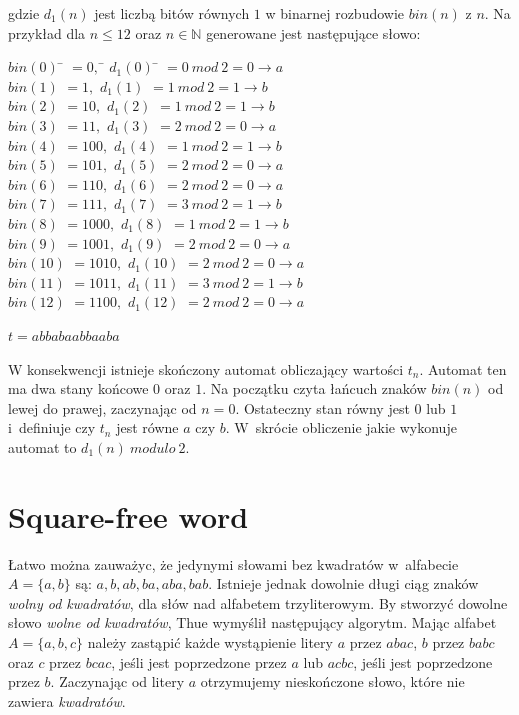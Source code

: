 \documentclass[document]{xmgr}
\begin{document}
\noindent gdzie $d_1(n)$ jest liczbą bitów równych $1$ w binarnej rozbudowie $bin(n)$ z $n$. Na przykład dla $n \leq 12$ oraz $n \in \mathbb{N}$ generowane jest następujące słowo:

\begin{tabbing}
\centering
$bin(0)$\hspace{1em} \= $= 0,$\hspace{7em} \= $d_1 (0)$\hspace{1em} \= $= 0\ mod\ 2 = 0 \to a$ \\
$bin(1)$ \> $= 1,$ \> $d_1 (1)$ \> $= 1\ mod\ 2 = 1 \to b$\\
$bin(2)$ \> $= 10,$ \> $d_1 (2)$ \> $= 1\ mod\ 2 = 1 \to b$\\
$bin(3)$ \> $= 11,$ \> $d_1 (3)$ \> $= 2\ mod\ 2 = 0 \to a$\\
$bin(4)$ \> $= 100,$ \> $d_1 (4)$ \> $= 1\ mod\ 2 = 1 \to b$\\
$bin(5)$ \> $= 101,$ \> $d_1 (5)$ \> $= 2\ mod\ 2 = 0 \to a$\\
$bin(6)$ \> $= 110,$ \> $d_1 (6)$ \> $= 2\ mod\ 2 = 0 \to a$\\
$bin(7)$ \> $= 111,$ \> $d_1 (7)$ \> $= 3\ mod\ 2 = 1 \to b$\\
$bin(8)$ \> $= 1000,$ \> $d_1 (8)$ \> $= 1\ mod\ 2 = 1 \to b$\\
$bin(9)$ \> $= 1001,$ \> $d_1 (9)$ \> $= 2\ mod\ 2 = 0 \to a$\\
$bin(10)$ \> $= 1010,$	\> $d_1 (10)$ \> $= 2\ mod\ 2 = 0 \to a$\\
$bin(11)$ \> $= 1011,$ 	\> $d_1 (11)$ \> $= 3\ mod\ 2 = 1 \to b$\\
$bin(12)$ \> $= 1100,$ 	\> $d_1 (12)$ \> $= 2\ mod\ 2 = 0 \to a$
\end{tabbing}

{\centering $t = abbabaabbaaba$ \par}

W konsekwencji istnieje skończony automat obliczający wartości $t_n$. Automat ten ma dwa stany końcowe $0$ oraz $1$. Na początku czyta łańcuch znaków $bin(n)$ od lewej do prawej, zaczynając od $n=0$. Ostateczny stan równy jest $0$ lub $1$ i~definiuje czy $t_n$ jest równe $a$ czy $b$. W~skrócie obliczenie jakie wykonuje automat to $d_1(n)\ modulo\ 2$.


\section{Square-free word}
Łatwo można zauważyc, że jedynymi słowami bez kwadratów w~alfabecie $A = \{a, b\}$ są: $a, b, ab, ba, aba, bab$. Istnieje jednak dowolnie długi ciąg znaków \emph{wolny od kwadratów}, dla słów nad alfabetem trzyliterowym. By stworzyć dowolne słowo \emph{wolne od kwadratów}, Thue wymyślił następujący algorytm. Mając alfabet $A = \{a, b, c\}$ należy zastąpić każde wystąpienie litery $a$ przez $abac$,  $b$ przez $babc$ oraz $c$ przez $bcac$, jeśli jest poprzedzone przez $a$ lub $acbc$, jeśli jest poprzedzone przez $b$. Zaczynając od litery $a$ otrzymujemy nieskończone słowo, które nie zawiera \emph{kwadratów}.
\end{document}
